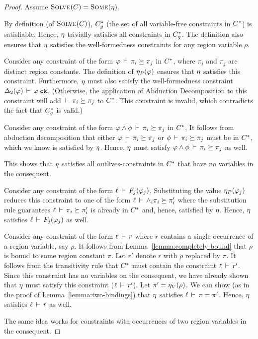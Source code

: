 \begin{proof}
Assume $\textsc{Solve}(C) = \textsc{Some}(\eta)$.

By definition (of $\textsc{Solve}(C)$), ${C}^*_g$ (the set of all variable-free constraints in ${C}^*$)
is satisfiable. Hence, $\eta$ trivially satisfies all constraints in ${C}^*_g$.
%
The definition also ensures that $\eta$ satisfies the well-formedness constraints
for any region variable $\rho$.

Consider any constraint of the form $\varphi\,\vdash\,\pi_i \succeq \pi_j$ in ${C}^*$,
where $\pi_i$ and $\pi_j$ are distinct region constants. The definition of $\eta_P(\varphi)$
ensures that $\eta$ satisfies this constraint.
Furthermore, $\eta$ must also satisfy the well-formedness constraint
${\Delta_2}(\varphi)\,\vdash\,\varphi \; \texttt{ok}$.
(Otherwise, the application of Abduction Decomposition to this constraint will add
$\,\vdash\,\pi_i \succeq \pi_j$ to ${C}^*$. This constraint is invalid, which
contradicts the fact that ${C}^*_g$ is valid.)

Consider any constraint of the form $\varphi \wedge \phi\,\vdash\,\pi_i \succeq \pi_j$ in ${C}^*$,
It follows from abduction decomposition that either
$\varphi\,\vdash\,\pi_i \succeq \pi_j$
or
$\phi\,\vdash\,\pi_i \succeq \pi_j$ must be in ${C}^*$, which we know is satisfied by $\eta$.
Hence, $\eta$ must satisfy
$\varphi \wedge \phi\,\vdash\,\pi_i \succeq \pi_j$ as well.

This shows that $\eta$ satisfies all outlives-constraints in ${C}^*$ that have no variables in the consequent.

Consider any constraint of the form $\ell\,\vdash\,F_j(\varphi_j)$.
Substituting the value $\eta_P(\varphi_j)$ reduces this constraint to one of
the form $\ell\,\vdash\,\wedge_i \pi_i \succeq \pi_i'$ where the substitution rule
guarantees $\ell\,\vdash\,\pi_i \succeq \pi_i'$ is already in ${C}^*$ and, hence,
satisfied by $\eta$.
Hence, $\eta$ satisfies $\ell\,\vdash\,F_j(\varphi_j)$ as well.

Consider any constraint of the form $\ell\,\vdash\,r$ where $r$ contains a single occurrence
of a region variable, say $\rho$.
It follows from Lemma~\ref{lemma:completely-bound} that $\rho$ is bound to some region
constant $\pi$.
Let $r'$ denote $r$ with $\rho$ replaced by $\pi$.
It follows from the transitivity rule that ${C}^*$ must contain the constraint $\ell\,\vdash\,r'$.
Since this constraint has no variables on the consequent, we have already shown that $\eta$
must satisfy this constraint ($\ell\,\vdash\,r'$).
Let $\pi' = \eta_V(\rho)$.
We can show (as in the proof of Lemma~\ref{lemma:two-bindings}) that $\eta$ satisfies $\ell\,\vdash\,\pi = \pi'$.
Hence, $\eta$ satisfies $\ell\,\vdash\,r$ as well.

The same idea works for constraints with occurrences of two region variables in the consequent.

\end{proof}

